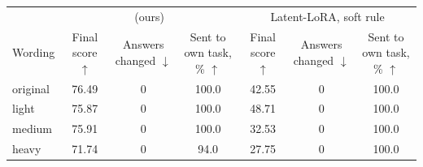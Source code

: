 \begin{tabular}{lcccccc}
    \toprule
    & \multicolumn{3}{c}{\cert{} (ours)} & \multicolumn{3}{c}{Latent-LoRA, soft rule} \\
    \cmidrule(lr){2-4} \cmidrule(lr){5-7}
    Wording & \shortstack[c]{Final\\score $\uparrow$} & \shortstack[c]{Answers\\changed $\downarrow$} & \shortstack[c]{Sent to own\\task, \% $\uparrow$} & \shortstack[c]{Final\\score $\uparrow$} & \shortstack[c]{Answers\\changed $\downarrow$} & \shortstack[c]{Sent to own\\task, \% $\uparrow$} \\
    \midrule
    original & 76.49 & 0 & 100.0 & 42.55 & 0 & 100.0 \\
    light & 75.87 & 0 & 100.0 & 48.71 & 0 & 100.0 \\
    medium & 75.91 & 0 & 100.0 & 32.53 & 0 & 100.0 \\
    heavy & 71.74 & 0 & 94.0 & 27.75 & 0 & 100.0 \\
    \bottomrule
\end{tabular}
